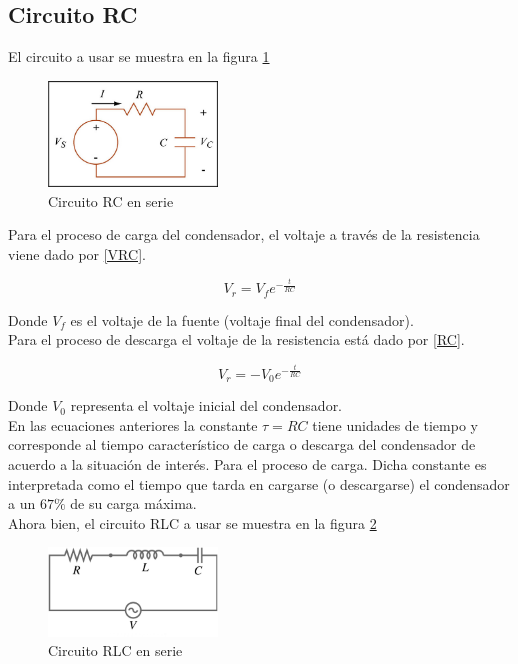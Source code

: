\documentclass[prb,aps,twocolumn,preprintnumbers,amsmath,amssymb]{revtex4}
\begin{document}
\subsection{Circuito RC}

El circuito a usar se muestra en la figura \ref{fig: RC}

\begin{figure}[h!]
	\centering
	\includegraphics[width=0.4\textwidth]{RC}
	\caption{Circuito RC en serie}
	\label{fig: RC}
\end{figure} 

Para el proceso de carga del condensador, el voltaje a través de la resistencia viene dado por \eqref{VRC}.

\begin{equation}
\label{VRC}
V_{r} = V_{f}e^{-\frac{t}{RC}}
\end{equation}

Donde $V_{f}$ es el voltaje de la fuente (voltaje final del condensador).\\

Para el proceso de descarga el voltaje de la resistencia está dado por \eqref{RC}.

\begin{equation}
\label{RC}
V_{r} = -V_{0}e^{-\frac{t}{RC}}
\end{equation}

Donde $V_{0}$ representa el voltaje inicial del condensador.\\

En las ecuaciones anteriores la constante $\tau = RC$ tiene unidades de tiempo y corresponde al tiempo característico de carga o descarga del condensador de acuerdo a la situación de interés. Para el proceso de carga. Dicha constante es interpretada como el tiempo que tarda en cargarse (o descargarse) el condensador a un $67\%$ de su carga máxima.\\

Ahora bien, el circuito RLC a usar se muestra en la figura \ref{fig: RLC}

\begin{figure}[h!]
	\centering
	\includegraphics[width=0.4\textwidth]{RLC}
	\caption{Circuito RLC en serie}
	\label{fig: RLC}
\end{figure}
\end{document}

